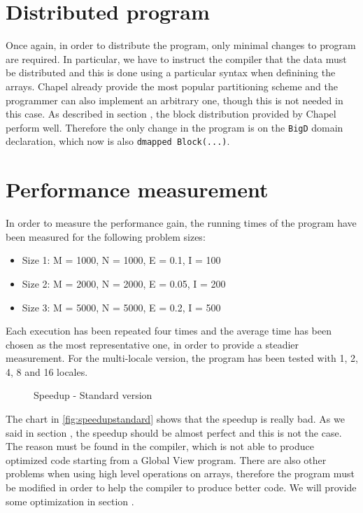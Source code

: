 \documentclass{article}
\begin{document}
\section{Distributed program}
Once again, in order to distribute the program, only minimal changes to program are required. In particular, we have to instruct the compiler that the data must be distributed and this is done using a particular syntax when definining the arrays. Chapel already provide the most popular partitioning scheme and the programmer can also implement an arbitrary one, though this is not needed in this case. As described in section , the block distribution provided by Chapel perform well. Therefore the only change in the program is on the \texttt{BigD} domain declaration, which now is also \texttt{dmapped Block(...)}.

\section{Performance measurement}
In order to measure the performance gain, the running times of the program have been measured for the following problem sizes:
\begin{itemize}
    \item Size 1: M = 1000, N = 1000, E = 0.1, I = 100
    \item Size 2: M = 2000, N = 2000, E = 0.05, I = 200
    \item Size 3: M = 5000, N = 5000, E = 0.2, I = 500
\end{itemize}
Each execution has been repeated four times and the average time has been chosen as the most representative one, in order to provide a steadier measurement. For the multi-locale version, the program has been tested with 1, 2, 4, 8 and 16 locales.
\begin{figure}
\centering
{}
\caption{Speedup - Standard version}
\label{fig:speedupstandard}
\end{figure}
The chart in \autoref{fig:speedupstandard} shows that the speedup is really bad. As we said in section , the speedup should be almost perfect and this is not the case. The reason must be found in the compiler, which is not able to produce optimized code starting from a Global View program. There are also other problems when using high level operations on arrays, therefore the program must be modified in order to help the compiler to produce better code. We will provide some optimization in section .
\end{document}
